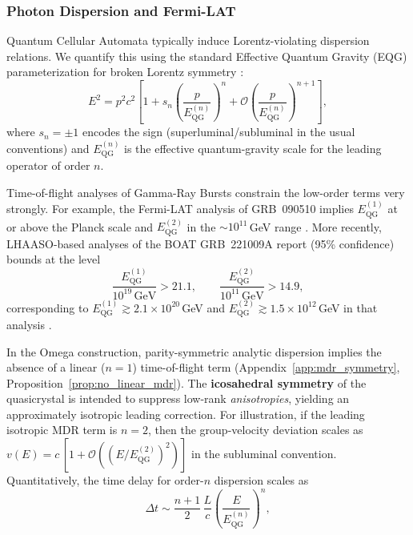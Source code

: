 \subsubsection{Photon Dispersion and Fermi-LAT}
Quantum Cellular Automata typically induce Lorentz-violating dispersion relations. We quantify this using the standard Effective Quantum Gravity (EQG) parameterization for broken Lorentz symmetry \cite{Mattingly2005}:
\begin{equation}
    E^2 = p^2 c^2 \left[ 1 + s_n\left( \frac{p}{E^{(n)}_{\mathrm{QG}}} \right)^n + \mathcal{O}\!\left(\frac{p}{E^{(n)}_{\mathrm{QG}}}\right)^{n+1} \right],
\end{equation}
where $s_n=\pm 1$ encodes the sign (superluminal/subluminal in the usual conventions) and $E^{(n)}_{\mathrm{QG}}$ is the effective quantum-gravity scale for the leading operator of order $n$.\par
\noindent
Time-of-flight analyses of Gamma-Ray Bursts constrain the low-order terms very strongly. For example, the Fermi-LAT analysis of GRB~090510 implies $E^{(1)}_{\mathrm{QG}}$ at or above the Planck scale and $E^{(2)}_{\mathrm{QG}}$ in the $\sim 10^{11}$\,GeV range \cite{Abdo2009,Vasileiou2013}. More recently, LHAASO-based analyses of the BOAT GRB~221009A report (95\% confidence) bounds at the level
\begin{equation}
    \frac{E^{(1)}_{\mathrm{QG}}}{10^{19}\,\mathrm{GeV}} > 21.1,\qquad
    \frac{E^{(2)}_{\mathrm{QG}}}{10^{11}\,\mathrm{GeV}} > 14.9,
\end{equation}
corresponding to $E^{(1)}_{\mathrm{QG}} \gtrsim 2.1\times 10^{20}$\,GeV and $E^{(2)}_{\mathrm{QG}} \gtrsim 1.5\times 10^{12}$\,GeV in that analysis \cite{Hua2025DisCan}.\par
\noindent
In the Omega construction, parity-symmetric analytic dispersion implies the absence of a linear ($n=1$) time-of-flight term (Appendix~\ref{app:mdr_symmetry}, Proposition~\ref{prop:no_linear_mdr}). The \textbf{icosahedral symmetry} of the quasicrystal is intended to suppress low-rank \emph{anisotropies}, yielding an approximately isotropic leading correction. For illustration, if the leading isotropic MDR term is $n=2$, then the group-velocity deviation scales as $v(E)=c\,[1+\mathcal{O}((E/E^{(2)}_{\mathrm{QG}})^2)]$ in the subluminal convention. Quantitatively, the time delay for order-$n$ dispersion scales as
\begin{equation}
    \Delta t \sim \frac{n+1}{2}\,\frac{L}{c}\left(\frac{E}{E^{(n)}_{\mathrm{QG}}}\right)^n,
\end{equation}
